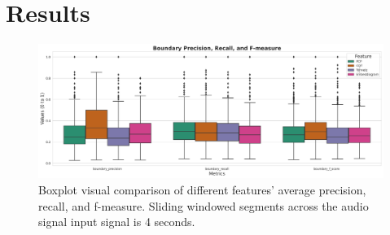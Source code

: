 \chapter{Results}



\begin{figure}
    \centering
    \includegraphics[width=\textwidth]{figures/images/boxplot.png}
    \caption[Metric comparison for different audio features.]{\small{Boxplot visual comparison of different features' average precision, recall, and f-measure. Sliding windowed segments across the audio signal input signal is 4 seconds.}}
    \label{fig:boxplotmetrics}
\end{figure}


\newpage



